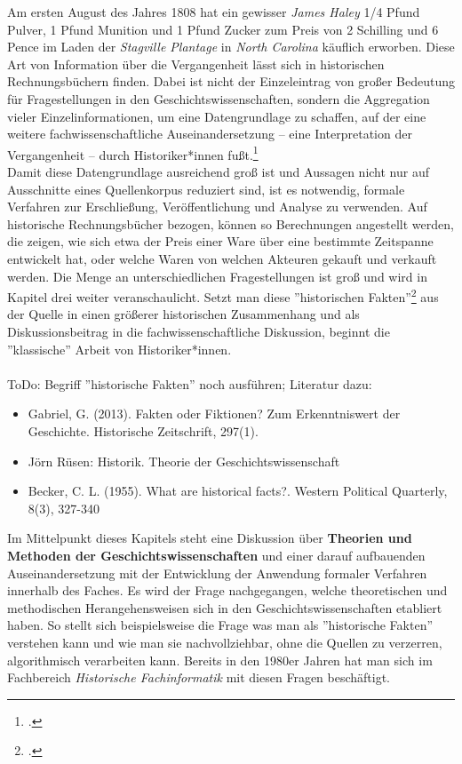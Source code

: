 \documentclass[12pt,a4paper]{article}
\begin{document}
Am ersten August des Jahres 1808 hat ein gewisser \textit{James Haley} 1/4 Pfund Pulver, 1 Pfund Munition und 1 Pfund Zucker zum Preis von 2 Schilling und 6 Pence im Laden der \textit{Stagville Plantage} in \textit{North Carolina} käuflich erworben. Diese Art von Information über die Vergangenheit lässt sich in historischen Rechnungsbüchern finden. Dabei ist nicht der Einzeleintrag von großer Bedeutung für Fragestellungen in den Geschichtswissenschaften, sondern die Aggregation vieler Einzelinformationen, um eine Datengrundlage zu schaffen, auf der eine weitere fachwissenschaftliche Auseinandersetzung -- eine Interpretation der Vergangenheit -- durch Historiker*innen fußt.\footcite[][06.06.2019]{vogeler2015mittelalterliche}
\\
Damit diese Datengrundlage ausreichend groß ist und Aussagen nicht nur auf Ausschnitte eines Quellenkorpus reduziert sind, ist es notwendig, formale Verfahren zur Erschließung, Veröffentlichung und Analyse zu verwenden. Auf historische Rechnungsbücher bezogen, können so Berechnungen angestellt werden, die zeigen, wie sich etwa der Preis einer Ware über eine bestimmte Zeitspanne entwickelt hat, oder welche Waren von welchen Akteuren gekauft und verkauft werden. Die Menge an unterschiedlichen Fragestellungen ist groß und wird in Kapitel drei weiter veranschaulicht. Setzt man diese ''historischen Fakten''\footcite[BECKER untersucht was als \textit{historische Fakten} verstanden werden kann bzw. wo und wann von diesen gesprochen wird:][]{becker1955historical} aus der Quelle in einen größerer historischen Zusammenhang und als Diskussionsbeitrag in die fachwissenschaftliche Diskussion, beginnt die ''klassische'' Arbeit von Historiker*innen. 
\\
\\
ToDo: Begriff ''historische Fakten'' noch ausführen;
Literatur dazu: 
\begin{itemize}
\item Gabriel, G. (2013). Fakten oder Fiktionen? Zum Erkenntniswert der Geschichte. Historische Zeitschrift, 297(1).
\item Jörn Rüsen: Historik. Theorie der Geschichtswissenschaft
\item Becker, C. L. (1955). What are historical facts?. Western Political Quarterly, 8(3), 327-340
\end{itemize}
Im Mittelpunkt dieses Kapitels steht eine Diskussion über \textbf{Theorien und Methoden der Geschichtswissenschaften} und einer darauf aufbauenden Auseinandersetzung mit der Entwicklung der Anwendung formaler Verfahren innerhalb des Faches. Es wird der Frage nachgegangen, welche theoretischen und methodischen Herangehensweisen sich in den Geschichtswissenschaften etabliert haben. So stellt sich beispielsweise die Frage was man als ''historische Fakten'' verstehen kann und wie man sie nachvollziehbar, ohne die Quellen zu verzerren, algorithmisch verarbeiten kann. Bereits in den 1980er Jahren hat man sich im Fachbereich \textit{Historische Fachinformatik} mit diesen Fragen beschäftigt.
\end{document}
